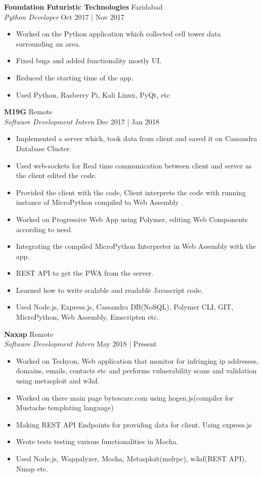 \documentclass[a4paper]{article}
\begin{document}
\textbf{Foundation Futuristic Technologies} \hfill Faridabad\\
\textit{Python Developer} \hfill Oct 2017 | Nov 2017\\
\vspace{-1mm}
\begin{itemize} \itemsep 1pt
	\item Worked on the Python application which collected cell tower data surrounding an area.
	\item Fixed bugs and added functionality mostly UI.
	\item Reduced the starting time of the app.
	\item Used Python, Rasberry Pi, Kali Linux, PyQt, etc
\end{itemize}
\textbf{M19G} \hfill Remote\\
\textit{Software Development Intern} \hfill Dec 2017 | Jan 2018\\
\vspace{-1mm}
\begin{itemize} \itemsep 1pt
	\item Implemented a server which, took data from client and saved it on Cassandra Database Cluster.
	\item Used web-sockets for Real time communication between client and server as the client edited the code.
	\item Provided the client with the code, Client interprets the code with running instance of MicroPython compiled to Web Assembly .
	\item Worked on Progressive Web App using Polymer, editing Web Components according to need.
	\item Integrating the compiled MicroPython Interpreter in Web Assembly with the app.
	\item REST API to get the PWA from the server.
	\item Learned how to write scalable and readable Javascript code.
	\item Used Node.js, Express.js, Cassandra DB(NoSQL), Polymer CLI, GIT, MicroPython, Web Assembly, Emscripten etc.
\end{itemize}
\textbf{Naxap} \hfill Remote\\
\textit{Software Development Intern} \hfill May 2018 | Present\\
\vspace{-1mm}
\begin{itemize} \itemsep 1pt
	\item Worked on Techyon, Web application that monitor for infringing ip addresses, domains, emails, contacts etc and performs vulnerability scans and validation using metasploit and w3af.
	\item Worked on there main page bytescare.com using hogen.js(compiler for Mustache templating language)
	\item Making REST API Endpoints for providing data for client. Using express.js
	\item Wrote tests testing various functionalities in Mocha.
	\item Used Node.js, Wappalyzer, Mocha, Metasploit(msfrpc), w3af(REST API), Nmap etc.
\end{itemize}
\end{document}
